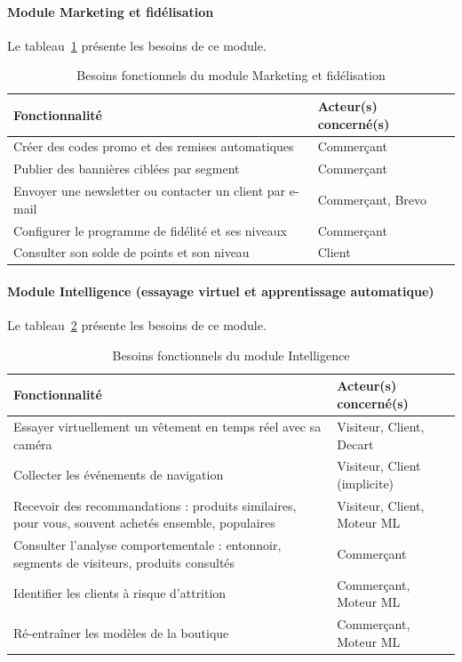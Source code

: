 \paragraph{Module Marketing et fidélisation}
Le tableau~\ref{tab:besoins-marketing} présente les besoins de ce module.
\begin{table}[H]
\centering
\renewcommand{\arraystretch}{1.3}
\begin{tabular}{|p{9.5cm}|p{5.5cm}|}
\hline
\textbf{Fonctionnalité} & \textbf{Acteur(s) concerné(s)} \\
\hline
Créer des codes promo et des remises automatiques & Commerçant \\
\hline
Publier des bannières ciblées par segment & Commerçant \\
\hline
Envoyer une newsletter ou contacter un client par e-mail & Commerçant, Brevo \\
\hline
Configurer le programme de fidélité et ses niveaux & Commerçant \\
\hline
Consulter son solde de points et son niveau & Client \\
\hline
\end{tabular}
\caption{Besoins fonctionnels du module Marketing et fidélisation}
\label{tab:besoins-marketing}
\end{table}

\paragraph{Module Intelligence (essayage virtuel et apprentissage automatique)}
Le tableau~\ref{tab:besoins-ia} présente les besoins de ce module.
\begin{table}[H]
\centering
\renewcommand{\arraystretch}{1.3}
\begin{tabular}{|p{9.5cm}|p{5.5cm}|}
\hline
\textbf{Fonctionnalité} & \textbf{Acteur(s) concerné(s)} \\
\hline
Essayer virtuellement un vêtement en temps réel avec sa caméra & Visiteur, Client, Decart \\
\hline
Collecter les événements de navigation & Visiteur, Client (implicite) \\
\hline
Recevoir des recommandations : produits similaires, pour vous, souvent achetés ensemble, populaires & Visiteur, Client, Moteur ML \\
\hline
Consulter l'analyse comportementale : entonnoir, segments de visiteurs, produits consultés & Commerçant \\
\hline
Identifier les clients à risque d'attrition & Commerçant, Moteur ML \\
\hline
Ré-entraîner les modèles de la boutique & Commerçant, Moteur ML \\
\hline
\end{tabular}
\caption{Besoins fonctionnels du module Intelligence}
\label{tab:besoins-ia}
\end{table}

